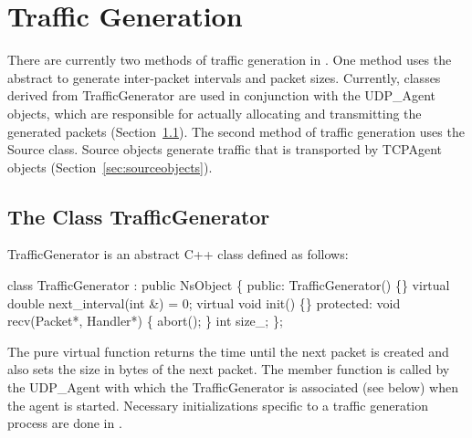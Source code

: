 %
\chapter{Traffic Generation}
\label{chap:trafgen}

There are currently two methods of traffic generation in \ns.
One method uses the abstract
to generate inter-packet intervals and packet sizes.
Currently, classes derived
from TrafficGenerator are used in conjunction with the UDP\_Agent
objects, which are responsible for actually allocating and
transmitting the generated packets (Section~\ref{sec:trafgenclass}).
The second method of traffic generation uses the Source class.
Source objects generate traffic that is transported by TCPAgent objects
(Section~\ref{sec:sourceobjects}).

\section{The Class TrafficGenerator}
\label{sec:trafgenclass}

TrafficGenerator is an abstract C++ class defined as follows:
\begin{program}
        class TrafficGenerator : public NsObject \{
        public:
                TrafficGenerator() \{\}
                virtual double next_interval(int &) = 0;
                virtual void init() \{\}
        protected:
                void recv(Packet*, Handler*) \{ abort(); \}
                int size_;
        \};
\end{program}
The pure virtual function  returns the time until the
next packet is created and also sets the size in bytes of the next
packet.
The member function  is called by the UDP\_Agent with
which the TrafficGenerator is associated (see below) when the agent is
started.
Necessary initializations specific to a traffic generation
process are done in .


